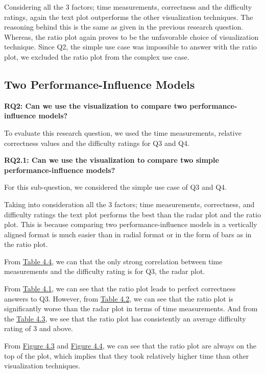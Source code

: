 Considering all the 3 factors; time measurements, correctness and the difficulty ratings, again the text plot outperforms the other visualization techniques. The reasoning behind this is the same as given in the previous research question. Whereas, the ratio plot again proves to be the unfavorable choice of visualization technique. Since Q2, the simple use case was impossible to answer with the ratio plot, we excluded the ratio plot from the complex use case.

\subsection*{Two Performance-Influence Models}
\vskip 0.2in
\begin{mdframed}
\textbf{RQ2: Can we use the visualization to compare two performance-influence models?}
\end{mdframed}

To evaluate this research question, we used the time measurements, relative correctness values and the difficulty ratings for Q3 and Q4.

\vskip 0.2in
\begin{mdframed}
\textbf{RQ2.1: Can we use the visualization to compare two simple performance-influence models?}
\end{mdframed}

For this sub-question, we considered the simple use case of Q3 and Q4.

Taking into consideration all the 3 factors; time measurements, correctness, and difficulty ratings the text plot performs the best than the radar plot and the ratio plot. This is because comparing two performance-influence models in a vertically aligned format is much easier than in radial format or in the form of bars as in the ratio plot.

From \hyperref[table:pearons]{Table 4.4}, we can that the only strong correlation between time measurements and the difficulty rating is for Q3, the radar plot. 

From \hyperref[table:correctness]{Table 4.1}, we can see that the ratio plot leads to perfect correctness answers to Q3. However, from  \hyperref[table:time]{Table 4.2}, we can see that the ratio plot is significantly worse than the radar plot in terms of time measurements. And from the \hyperref[table:rating]{Table 4.3}, we see that the ratio plot has consistently an average difficulty rating of 3 and above. 

From \hyperref[figure:paretoTwoQ3]{Figure 4.3} and \hyperref[figure:paretoTwoQ4]{Figure 4.4}, we can see that the ratio plot are always on the top of the plot, which implies that they took relatively higher time than other visualization techniques.

